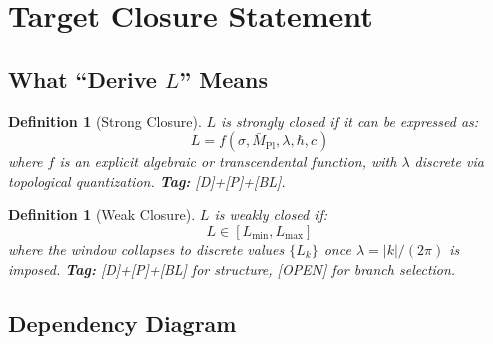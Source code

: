 \documentclass[11pt,a4paper]{article}
\newtheorem{definition}[theorem]{Definition}
\begin{document}
\section{Target Closure Statement}

\subsection{What ``Derive $L$'' Means}

\begin{definition}[Strong Closure]
$L$ is \emph{strongly closed} if it can be expressed as:
\begin{equation}
  L = f(\sigma, \bar{M}_{\text{Pl}}, \lambda, \hbar, c)
  \label{eq:strong-closure-def}
\end{equation}
where $f$ is an explicit algebraic or transcendental function, with $\lambda$
discrete via topological quantization. \textbf{Tag:} [D]+[P]+[BL].
\end{definition}

\begin{definition}[Weak Closure]
$L$ is \emph{weakly closed} if:
\begin{equation}
  L \in [L_{\min}, L_{\max}]
  \label{eq:weak-closure-def}
\end{equation}
where the window collapses to discrete values $\{L_k\}$ once $\lambda = |k|/(2\pi)$
is imposed. \textbf{Tag:} [D]+[P]+[BL] for structure, [OPEN] for branch selection.
\end{definition}

\subsection{Dependency Diagram}
\end{document}
